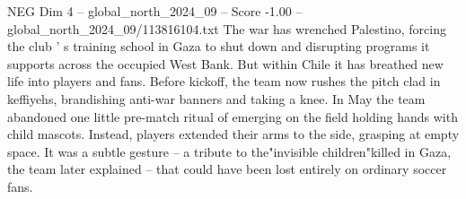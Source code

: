 \begin{textsample}{NEG Dim 4 – global\_north\_2024\_09 – Score -1.00 – global\_north\_2024\_09/113816104.txt}
The war has wrenched Palestino, forcing the club ' s training school in Gaza to shut down and disrupting programs it supports across the occupied West Bank.
But within Chile it has breathed new life into players and fans.
Before kickoff, the team now rushes the pitch clad in keffiyehs, brandishing anti-war banners and taking a knee.
In May the team abandoned one little pre-match ritual of emerging on the field holding hands with child mascots.
Instead, players extended their arms to the side, grasping at empty space.
It was a subtle gesture -- a tribute to the"invisible children"killed in Gaza, the team later explained -- that could have been lost entirely on ordinary soccer fans.

\end{textsample}
